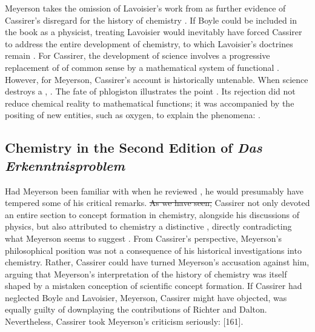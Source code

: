 \documentclass[submitted,12pt]{article}
\providecommand{\DIFdel}[1]{{\protect\color{red}\sout{#1}}}                      %
\providecommand{\DIFdelbegin}{} %
\providecommand{\DIFdelend}{} %
\begin{document}
Meyerson takes the omission of Lavoisier's work from \EPt as further evidence of Cassirer's disregard for the history of chemistry \citep[103]{Meyerson1911}.  If Boyle could be included in the book as a physicist, treating Lavoisier would inevitably have forced Cassirer to address the entire development of chemistry, to which Lavoisier's doctrines remain  \citep[103]{Meyerson1911}. For Cassirer, the development of science involves a progressive replacement of  of common sense by a mathematical system of functional . However, for Meyerson, Cassirer's account is historically untenable. When science destroys a ,   \citep[129]{Meyerson1911}. The fate of phlogiston illustrates the point \citep[see][203]{Meyerson1908}. Its rejection did not reduce chemical reality to mathematical functions; it was accompanied by the positing of new entities, such as oxygen, to explain the phenomena:  \citep[129]{Meyerson1911}. 

\subsection{Chemistry in the Second Edition of \emph{Das Erkenntnisproblem}}
%
Had Meyerson been familiar with \SFt when he reviewed \EPt, he would presumably have tempered some of his critical remarks. \DIFdelbegin \DIFdel{As we have seen, }\DIFdelend Cassirer not only devoted an entire section to concept formation in chemistry, alongside his discussions of physics, but also attributed to chemistry a distinctive , directly contradicting what Meyerson seems to suggest . From Cassirer's perspective, Meyerson's philosophical position was not a consequence of his historical investigations into chemistry. Rather, Cassirer could have turned Meyerson's accusation against him, arguing that Meyerson's interpretation of the history of chemistry was itself shaped by a mistaken conception of scientific concept formation. If Cassirer had neglected Boyle and Lavoisier, Meyerson, Cassirer might have objected, was equally guilty of downplaying the contributions of Richter and Dalton. Nevertheless, Cassirer took Meyerson's criticism seriously:  [161].
\end{document}
